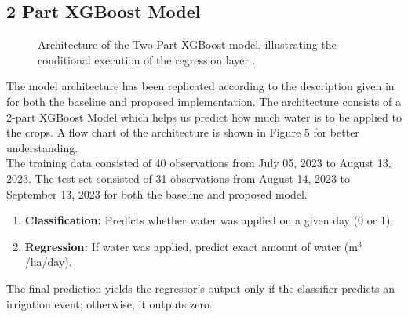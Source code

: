 \documentclass[conference]{IEEEtran}
\begin{document}
\subsection{2 Part XGBoost Model}
\begin{figure}[h]
\centering
{}
\caption{Architecture of the Two-Part XGBoost model, illustrating the conditional execution of the regression layer \cite{base}.}
\label{fig:model_flow}
\end{figure}

The model architecture has been replicated according to the description given in \cite{base} for both the baseline and proposed implementation. The architecture consists of a 2-part XGBoost Model which helps us predict how much water is to be applied to the crops. A flow chart of the architecture is shown in Figure 5 for better understanding.\\
The training data consisted of 40 observations from July 05, 2023 to August 13, 2023. The test set consisted of 31 observations from August 14, 2023 to September 13, 2023 for both the baseline and proposed model.
\begin{enumerate}
    \item \textbf{Classification:} Predicts whether water was applied on a given day (0 or 1).
    \item \textbf{Regression:} If water was applied, predict exact amount of water (m$^3$/ha/day).
\end{enumerate}
The final prediction yields the regressor’s output only if the classifier predicts an irrigation event; otherwise, it outputs zero.
\end{document}
